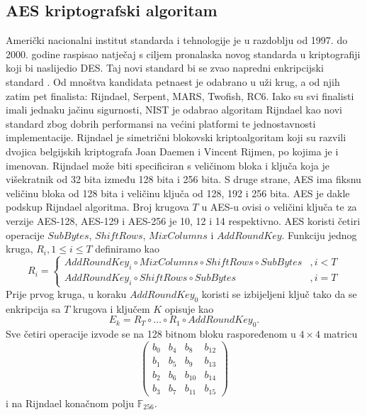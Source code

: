 \documentclass[times, utf8, diplomski]{fer}
\begin{document}
\subsection{AES kriptografski algoritam}
Američki nacionalni institut standarda i tehnologije  je u razdoblju od 1997. do 2000. godine raspisao natječaj s ciljem pronalaska novog standarda u kriptografiji koji bi naslijedio DES. Taj novi standard bi se zvao napredni enkripcijski standard . Od mnoštva kandidata petnaest je odabrano u uži krug, a od njih zatim pet finalista: Rijndael, Serpent, MARS, Twofish, RC6. Iako su svi finalisti imali jednaku jačinu sigurnosti, NIST je odabrao algoritam Rijndael kao novi standard zbog dobrih performansi na većini platformi te jednostavnosti implementacije. Rijndael je simetrični blokovski kriptoalgoritam koji su razvili dvojica belgijskih kriptografa Joan Daemen i Vincent Rijmen, po kojima je i imenovan. Rijndael može biti specificiran s veličinom bloka i ključa koja je višekratnik od 32 bita između 128 bita i 256 bita. S druge strane, AES ima fiksnu veličinu bloka od 128 bita i veličinu ključa od 128, 192 i 256 bita. AES je dakle podskup Rijndael algoritma. Broj krugova $T$ u AES-u ovisi o veličini ključa te za verzije AES-128, AES-129 i AES-256 je 10, 12 i 14 respektivno. AES koristi četiri operacije $SubBytes$, $ShiftRows$, $MixColumns$ i $AddRoundKey$. Funkciju jednog kruga, $R_i, 1 \le i \le T$ definiramo kao
\begin{equation}
    R_i =
    \begin{cases}
        AddRoundKey_i \circ MixColumns \circ ShiftRows \circ SubBytes & , i < T \\
        AddRoundKey_i \circ ShiftRows \circ SubBytes                  & , i = T
    \end{cases}
\end{equation}
Prije prvog kruga, u koraku $AddRoundKey_0$ koristi se izbijeljeni ključ tako da se enkripcija sa $T$ krugova i ključem $K$ opisuje kao
\begin{equation}
    E_k = R_T \circ \dots \circ R_1 \circ AddRoundKey_0.
\end{equation}
Sve četiri operacije izvode se na 128 bitnom bloku raspoređenom u $4 \times 4$ matricu
\[
    \begin{pmatrix}
        b_{0} & b_{4} & b_{8}  & b_{12} \\
        b_{1} & b_{5} & b_{9}  & b_{13} \\
        b_{2} & b_{6} & b_{10} & b_{14} \\
        b_{3} & b_{7} & b_{11} & b_{15}
    \end{pmatrix}
\]
i na Rijndael konačnom polju $\mathbb{F}_{256}$.
\end{document}
